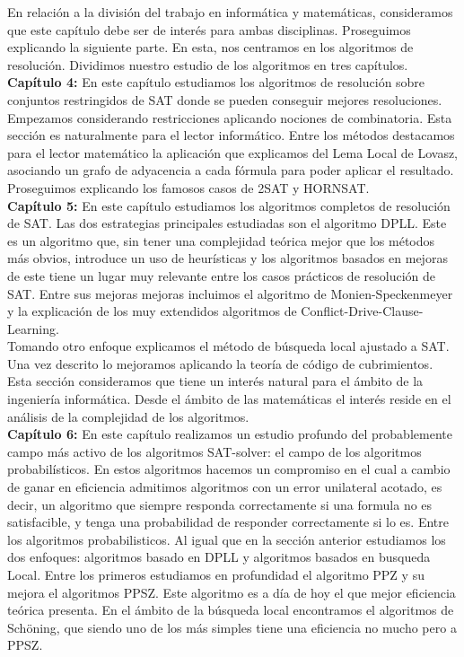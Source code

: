 En relación a la división del trabajo en informática y matemáticas, consideramos que este capítulo debe ser de interés para ambas disciplinas. Proseguimos explicando la siguiente parte. En esta, nos centramos en los algoritmos de resolución. Dividimos nuestro estudio de los algoritmos en tres capítulos.\\


\textbf{Capítulo 4:} En este capítulo estudiamos los algoritmos de resolución sobre conjuntos restringidos de SAT donde se pueden conseguir mejores resoluciones. Empezamos considerando restricciones aplicando nociones de combinatoria. Esta sección es naturalmente para el lector informático. Entre los métodos destacamos para el lector matemático la aplicación que explicamos del Lema Local de Lovasz, asociando un grafo de adyacencia a cada fórmula para poder aplicar el resultado. Proseguimos explicando los famosos casos de 2SAT y HORNSAT. \\

\textbf{Capítulo 5:} En este capítulo estudiamos los algoritmos completos de resolución de SAT. Las dos estrategias principales estudiadas son el algoritmo DPLL. Este es un algoritmo que, sin tener una complejidad teórica mejor que los métodos más obvios, introduce un uso de heurísticas y los algoritmos basados en mejoras de este tiene un lugar muy relevante entre los casos prácticos de resolución de SAT. Entre sus mejoras mejoras incluimos el algoritmo de Monien-Speckenmeyer y la explicación de los muy extendidos algoritmos de Conflict-Drive-Clause-Learning.\\

Tomando otro enfoque explicamos el método de búsqueda local ajustado a SAT. Una vez descrito lo mejoramos aplicando la teoría de código de cubrimientos. Esta sección consideramos que tiene un interés natural para el ámbito de la ingeniería informática. Desde el ámbito de las matemáticas el interés reside en el análisis de la complejidad de los algoritmos.\\

\textbf{Capítulo 6:} En este capítulo realizamos un estudio profundo del probablemente campo más activo de los algoritmos SAT-solver: el campo de los algoritmos probabilísticos. En estos algoritmos hacemos un compromiso en el cual a cambio de ganar en eficiencia admitimos algoritmos con un error unilateral acotado, es decir, un algoritmo que siempre responda correctamente si una formula no es satisfacible, y tenga una probabilidad de responder correctamente si lo es. Entre los algoritmos probabilisticos. Al igual que en la sección anterior estudiamos los dos enfoques: algoritmos basado en DPLL y algoritmos basados en busqueda Local. Entre los primeros estudiamos en profundidad el algoritmo PPZ y su mejora el algoritmos PPSZ. Este algoritmo es a día de hoy el que mejor eficiencia teórica presenta. En el ámbito de la búsqueda local encontramos el algoritmos de Schöning, que siendo uno de los más simples tiene una eficiencia no mucho pero a PPSZ. \\

